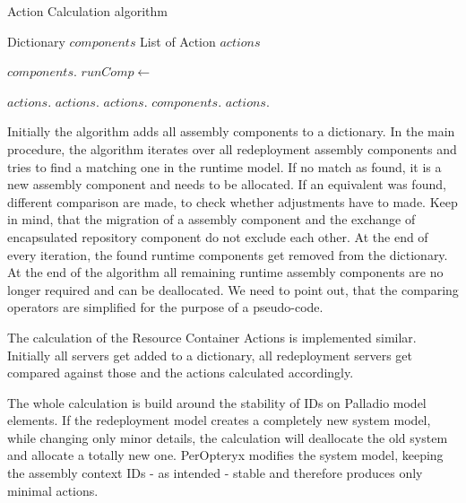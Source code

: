 \begin{algorithm}[h]
	\caption{Action Calculation algorithm}
	\label{algo:action_calc}
	\begin{algorithmic}[1]
		
		\State Dictionary $components$
		\State List of Action $actions$
		\State
		
			\State
			$components.$
			\EndFor
		\EndProcedure
		\State
		\State
		\State
			\State
				$runComp\gets $ 
				
				 \State
					$actions.$
				\Else
						\State $actions.$
					\EndIf
						\State $actions.$
					\EndIf
				\EndIf
				\State $components.$
			\EndFor
			\State
				\State $actions.$
			\EndFor
		\EndProcedure
	\end{algorithmic}
\end{algorithm}

Initially the algorithm adds all assembly components to a dictionary. In the main procedure, the algorithm iterates over all redeployment assembly components and tries to find a matching one in the runtime model. If no match as found, it is a new assembly component and needs to be allocated. If an equivalent was found, different comparison are made, to check whether adjustments have to made. Keep in mind, that the migration of a assembly component and the exchange of encapsulated repository component do not exclude each other. At the end of every iteration, the found runtime components get removed from the dictionary. At the end of the algorithm all remaining runtime assembly components are no longer required and can be deallocated. We need to point out, that the comparing operators are simplified for the purpose of a pseudo-code.

The calculation of the Resource Container Actions is implemented similar. Initially all servers get added to a dictionary, all redeployment servers get compared against those and the actions calculated accordingly.

The whole calculation is build around the stability of IDs on Palladio model elements. If the redeployment model creates a completely new system model, while changing only minor details, the calculation will deallocate the old system and allocate a totally new one. PerOpteryx modifies the system model, keeping the assembly context IDs - as intended - stable and therefore produces only minimal actions.




